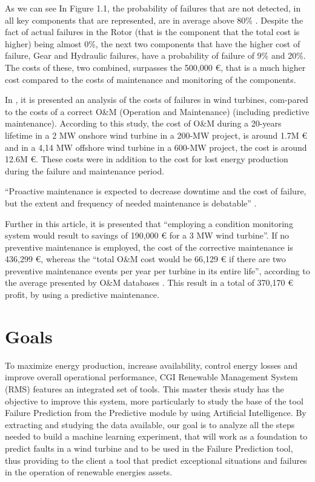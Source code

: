 As we can see In Figure 1.1, the probability of failures that are not detected, in all key components that are represented, are in average above 80\% . Despite the fact of actual failures in the Rotor (that is the component that the total cost is higher) being almost 0\%, the next two components that have the higher cost of failure, Gear and Hydraulic failures, have a probability of failure of 9\%  and 20\%. The costs of these, two combined, surpasses the 500,000 €, that is a much higher cost compared to the costs of maintenance and monitoring of the components.


In \cite{OLD_53_WIND}, it is presented an analysis of the costs of failures in wind turbines, com-pared to the costs of a correct O&M (Operation and Maintenance) (including predictive maintenance). According to this study, the cost of O\&M during a 20-years lifetime in a 2 MW onshore wind turbine in a 200-MW project, is around 1.7M € and in a 4,14 MW offshore wind turbine in a 600-MW project, the cost is around 12.6M €. These costs were in addition to the cost for lost energy production during the failure and maintenance period.

“Proactive maintenance is expected to decrease downtime and the cost of failure, but the extent and frequency of needed maintenance is debatable” \cite{OLD_53_WIND}.

Further in this article, it is presented that “employing a condition monitoring system would result to savings of 190,000 € for a 3 MW wind turbine”. If no preventive maintenance is employed, the cost of the corrective maintenance is 436,299 €, whereas the “total O\&M cost would be 66,129 € if there are two preventive maintenance events per year per turbine in its entire life”, according to the average presented by O&M databases \cite{OLD_53_WIND}. This result in a total of 370,170 € profit, by using a predictive maintenance.

\section{Goals} 
\label{sub:if_you_use_this_template} 

To maximize energy production, increase availability, control energy losses and improve overall operational performance, CGI Renewable Management System (RMS) \cite{OLD_8} features an integrated set of tools. This master thesis study has the objective to improve this system, more particularly to study the base of the tool Failure Prediction from the Predictive module by using Artificial Intelligence. By extracting and studying the data available, our goal is to analyze all the steps needed to build a machine learning experiment, that will work as a foundation to predict faults in a wind turbine and to be used in the Failure Prediction tool, thus providing to the client a tool that predict exceptional situations and failures in the operation of renewable energies assets.

